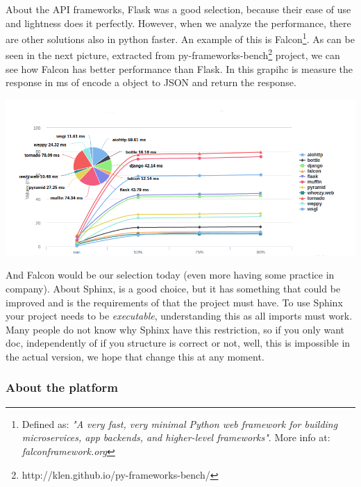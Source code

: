 \noindent About the API frameworks, Flask was a good selection, because their ease of use
and lightness does it perfectly. However, when we analyze the performance, there are
other solutions also in python faster. An example of this is Falcon\footnote{Defined as: \textit{"A
very fast, very minimal Python web framework for building microservices, app backends,
and higher-level frameworks"}. More info at: \textit{falconframework.org}}. As can be
seen in the next picture, extracted from py-frameworks-bench\footnote{
http://klen.github.io/py-frameworks-bench/} project, we can see how Falcon has
better performance than Flask. In this grapihc is measure the response in ms
of encode a object to JSON and return the response.

\begin{center}
\includegraphics[scale=0.5]{img/graphics/frameworks.png}
\end{center}

\noindent And Falcon would be our selection today (even more having some practice in
company).
\linebreak
\linebreak
\noindent About Sphinx, is a good choice, but it has something that could be improved and
is the requirements of that the project must have. To use Sphinx your project
needs to be \textit{executable}, understanding this as all imports must work.
Many people do not know why Sphinx have this restriction, so if you
only want doc, independently of if you structure is correct or not, well, this is
impossible in the actual version, we hope that change this at any moment.

\subsubsection{About the platform}


